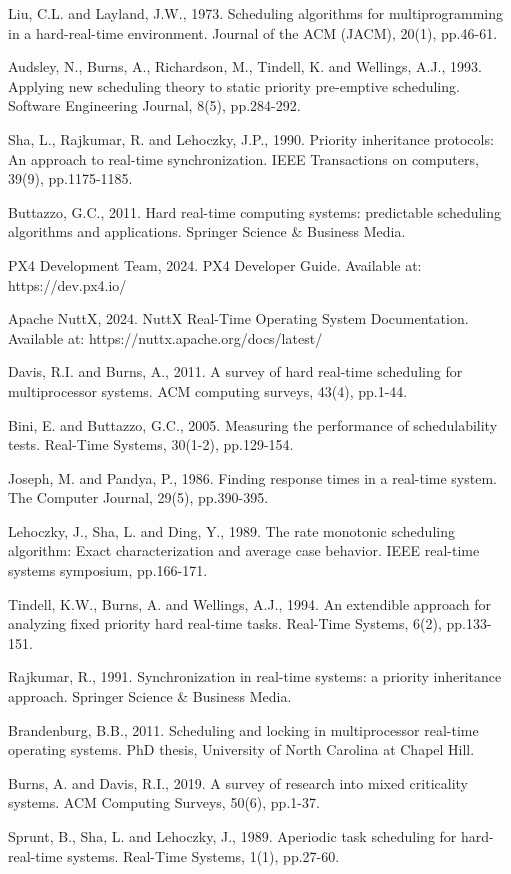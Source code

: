 \documentclass[12pt,a4paper]{article}
\begin{document}
\begin{thebibliography}{20}
Liu, C.L. and Layland, J.W., 1973. Scheduling algorithms for multiprogramming in a hard-real-time environment. Journal of the ACM (JACM), 20(1), pp.46-61.

Audsley, N., Burns, A., Richardson, M., Tindell, K. and Wellings, A.J., 1993. Applying new scheduling theory to static priority pre-emptive scheduling. Software Engineering Journal, 8(5), pp.284-292.

Sha, L., Rajkumar, R. and Lehoczky, J.P., 1990. Priority inheritance protocols: An approach to real-time synchronization. IEEE Transactions on computers, 39(9), pp.1175-1185.

Buttazzo, G.C., 2011. Hard real-time computing systems: predictable scheduling algorithms and applications. Springer Science \& Business Media.

PX4 Development Team, 2024. PX4 Developer Guide. Available at: https://dev.px4.io/

Apache NuttX, 2024. NuttX Real-Time Operating System Documentation. Available at: https://nuttx.apache.org/docs/latest/

Davis, R.I. and Burns, A., 2011. A survey of hard real-time scheduling for multiprocessor systems. ACM computing surveys, 43(4), pp.1-44.

Bini, E. and Buttazzo, G.C., 2005. Measuring the performance of schedulability tests. Real-Time Systems, 30(1-2), pp.129-154.

Joseph, M. and Pandya, P., 1986. Finding response times in a real-time system. The Computer Journal, 29(5), pp.390-395.

Lehoczky, J., Sha, L. and Ding, Y., 1989. The rate monotonic scheduling algorithm: Exact characterization and average case behavior. IEEE real-time systems symposium, pp.166-171.

Tindell, K.W., Burns, A. and Wellings, A.J., 1994. An extendible approach for analyzing fixed priority hard real-time tasks. Real-Time Systems, 6(2), pp.133-151.

Rajkumar, R., 1991. Synchronization in real-time systems: a priority inheritance approach. Springer Science \& Business Media.

Brandenburg, B.B., 2011. Scheduling and locking in multiprocessor real-time operating systems. PhD thesis, University of North Carolina at Chapel Hill.

Burns, A. and Davis, R.I., 2019. A survey of research into mixed criticality systems. ACM Computing Surveys, 50(6), pp.1-37.

Sprunt, B., Sha, L. and Lehoczky, J., 1989. Aperiodic task scheduling for hard-real-time systems. Real-Time Systems, 1(1), pp.27-60.

\end{thebibliography}
\end{document}
